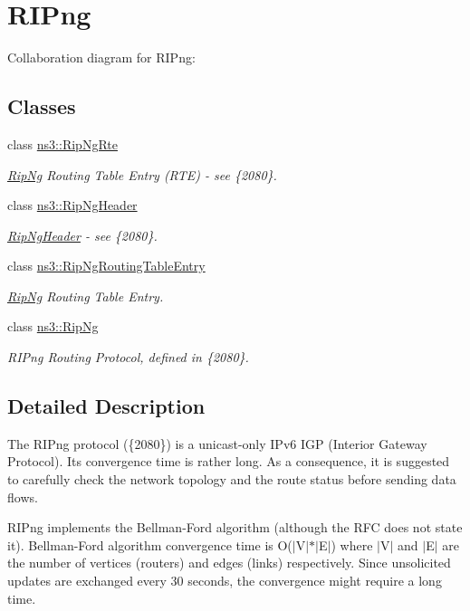 \hypertarget{group__ripng}{}\section{R\+I\+Png}
\label{group__ripng}
Collaboration diagram for R\+I\+Png\+:
\subsection*{Classes}
\begin{DoxyCompactItemize}
\item 
class \hyperlink{classns3_1_1RipNgRte}{ns3\+::\+Rip\+Ng\+Rte}
\begin{DoxyCompactList}\small\item\em \hyperlink{classns3_1_1RipNg}{Rip\+Ng} Routing Table Entry (R\+TE) -\/ see \{2080\}. \end{DoxyCompactList}\item 
class \hyperlink{classns3_1_1RipNgHeader}{ns3\+::\+Rip\+Ng\+Header}
\begin{DoxyCompactList}\small\item\em \hyperlink{classns3_1_1RipNgHeader}{Rip\+Ng\+Header} -\/ see \{2080\}. \end{DoxyCompactList}\item 
class \hyperlink{classns3_1_1RipNgRoutingTableEntry}{ns3\+::\+Rip\+Ng\+Routing\+Table\+Entry}
\begin{DoxyCompactList}\small\item\em \hyperlink{classns3_1_1RipNg}{Rip\+Ng} Routing Table Entry. \end{DoxyCompactList}\item 
class \hyperlink{classns3_1_1RipNg}{ns3\+::\+Rip\+Ng}
\begin{DoxyCompactList}\small\item\em R\+I\+Png Routing Protocol, defined in \{2080\}. \end{DoxyCompactList}\end{DoxyCompactItemize}


\subsection{Detailed Description}
The R\+I\+Png protocol (\{2080\}) is a unicast-\/only I\+Pv6 I\+GP (Interior Gateway Protocol). Its convergence time is rather long. As a consequence, it is suggested to carefully check the network topology and the route status before sending data flows.

R\+I\+Png implements the Bellman-\/\+Ford algorithm (although the R\+FC does not state it). Bellman-\/\+Ford algorithm convergence time is O($\vert$\+V$\vert$$\ast$$\vert$\+E$\vert$) where $\vert$\+V$\vert$ and $\vert$\+E$\vert$ are the number of vertices (routers) and edges (links) respectively. Since unsolicited updates are exchanged every 30 seconds, the convergence might require a long time.

